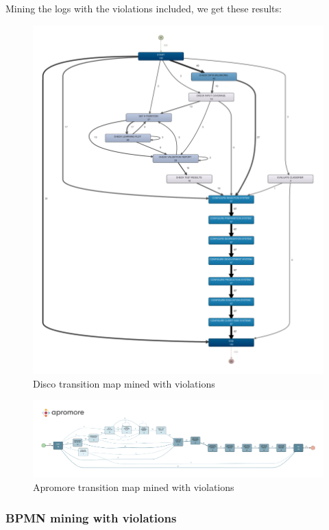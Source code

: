 Mining the logs with the violations included, we get these results:

\begin{figure}[H]
\centering
\includegraphics[width=\textwidth]{figures/disco_violations_map.pdf}
\caption{Disco transition map mined with violations}
\label{fig:disco_violations_map}
\end{figure}

\begin{figure}[H]
\centering
\includegraphics[width=\textwidth]{figures/apromore_violations_map.pdf}
\caption{Apromore transition map mined with violations}
\label{fig:apromore_violations_map}
\end{figure}

\subsubsection{BPMN mining with violations}

